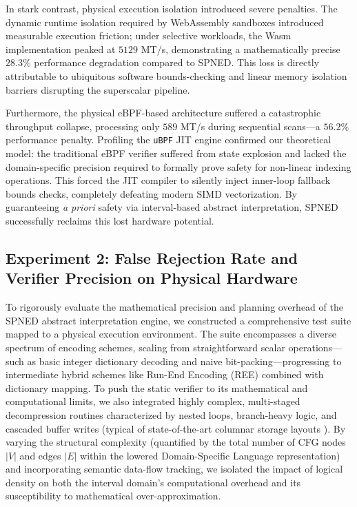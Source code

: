 \documentclass[onecolumn]{IEEEtran}
\numberwithin{equation}{section}
\theoremstyle{definition}
\theoremstyle{remark}
\begin{document}
In stark contrast, physical execution isolation introduced severe penalties. The dynamic runtime isolation required by WebAssembly sandboxes \cite{gienieczko2025anyblox} introduced measurable execution friction; under selective workloads, the Wasm implementation peaked at $5129$ MT/s, demonstrating a mathematically precise $\mathbf{28.3\%}$ performance degradation compared to SPNED. This loss is directly attributable to ubiquitous software bounds-checking and linear memory isolation barriers disrupting the superscalar pipeline. 

Furthermore, the physical eBPF-based architecture \cite{hedam2023delilah} suffered a catastrophic throughput collapse, processing only $589$ MT/s during sequential scans—a $\mathbf{56.2\%}$ performance penalty. Profiling the \texttt{uBPF} JIT engine confirmed our theoretical model: the traditional eBPF verifier suffered from state explosion and lacked the domain-specific precision required to formally prove safety for non-linear indexing operations. This forced the JIT compiler to silently inject inner-loop fallback bounds checks, completely defeating modern SIMD vectorization. By guaranteeing \textit{a priori} safety via interval-based abstract interpretation, SPNED successfully reclaims this lost hardware potential.
















\subsection{Experiment 2: False Rejection Rate and Verifier Precision on Physical Hardware}

To rigorously evaluate the mathematical precision and planning overhead of the SPNED abstract interpretation engine, we constructed a comprehensive test suite mapped to a physical execution environment. The suite encompasses a diverse spectrum of encoding schemes, scaling from straightforward scalar operations—such as basic integer dictionary decoding and naive bit-packing—progressing to intermediate hybrid schemes like Run-End Encoding (REE) combined with dictionary mapping. To push the static verifier to its mathematical and computational limits, we also integrated highly complex, multi-staged decompression routines characterized by nested loops, branch-heavy logic, and cascaded buffer writes (typical of state-of-the-art columnar storage layouts \cite{kuschewski2023btrblocks}). By varying the structural complexity (quantified by the total number of CFG nodes $|V|$ and edges $|E|$ within the lowered Domain-Specific Language representation) and incorporating semantic data-flow tracking, we isolated the impact of logical density on both the interval domain's computational overhead and its susceptibility to mathematical over-approximation. 
\end{document}
